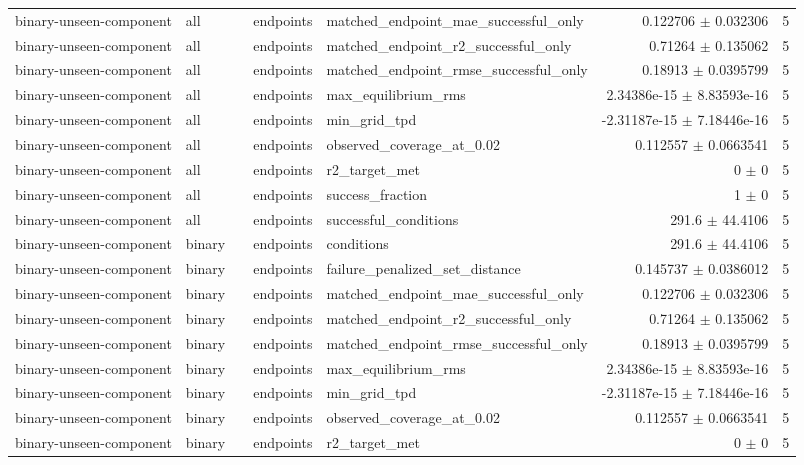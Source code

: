 \begin{tabular}{lllllrr}
binary-unseen-component & all &  & endpoints & matched_endpoint_mae_successful_only & 0.122706 $\pm$ 0.032306 & 5 \\
binary-unseen-component & all &  & endpoints & matched_endpoint_r2_successful_only & 0.71264 $\pm$ 0.135062 & 5 \\
binary-unseen-component & all &  & endpoints & matched_endpoint_rmse_successful_only & 0.18913 $\pm$ 0.0395799 & 5 \\
binary-unseen-component & all &  & endpoints & max_equilibrium_rms & 2.34386e-15 $\pm$ 8.83593e-16 & 5 \\
binary-unseen-component & all &  & endpoints & min_grid_tpd & -2.31187e-15 $\pm$ 7.18446e-16 & 5 \\
binary-unseen-component & all &  & endpoints & observed_coverage_at_0.02 & 0.112557 $\pm$ 0.0663541 & 5 \\
binary-unseen-component & all &  & endpoints & r2_target_met & 0 $\pm$ 0 & 5 \\
binary-unseen-component & all &  & endpoints & success_fraction & 1 $\pm$ 0 & 5 \\
binary-unseen-component & all &  & endpoints & successful_conditions & 291.6 $\pm$ 44.4106 & 5 \\
binary-unseen-component & binary &  & endpoints & conditions & 291.6 $\pm$ 44.4106 & 5 \\
binary-unseen-component & binary &  & endpoints & failure_penalized_set_distance & 0.145737 $\pm$ 0.0386012 & 5 \\
binary-unseen-component & binary &  & endpoints & matched_endpoint_mae_successful_only & 0.122706 $\pm$ 0.032306 & 5 \\
binary-unseen-component & binary &  & endpoints & matched_endpoint_r2_successful_only & 0.71264 $\pm$ 0.135062 & 5 \\
binary-unseen-component & binary &  & endpoints & matched_endpoint_rmse_successful_only & 0.18913 $\pm$ 0.0395799 & 5 \\
binary-unseen-component & binary &  & endpoints & max_equilibrium_rms & 2.34386e-15 $\pm$ 8.83593e-16 & 5 \\
binary-unseen-component & binary &  & endpoints & min_grid_tpd & -2.31187e-15 $\pm$ 7.18446e-16 & 5 \\
binary-unseen-component & binary &  & endpoints & observed_coverage_at_0.02 & 0.112557 $\pm$ 0.0663541 & 5 \\
binary-unseen-component & binary &  & endpoints & r2_target_met & 0 $\pm$ 0 & 5 \\

\end{tabular}
